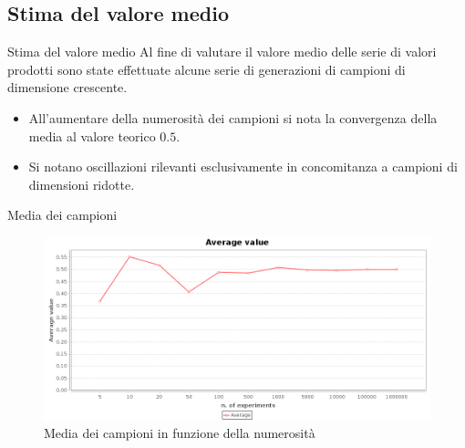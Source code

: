 \documentclass[slidestop,compress,mathserif]{beamer}
\begin{document}
\subsection{Stima del valore medio}
\begin{frame}{Stima del valore medio}
\vfill
Al fine di valutare il valore medio delle serie di valori prodotti sono state effettuate alcune serie di generazioni di campioni di dimensione crescente.
\begin{itemize}
	\footnotesize
	\item[\textbullet] All'aumentare della numerosit\`a dei campioni si nota la convergenza della media al valore teorico $0.5$.
	\item[\textbullet] Si notano oscillazioni rilevanti esclusivamente in concomitanza a campioni di dimensioni ridotte.
\end{itemize}
\vfill
\end{frame}

\begin{frame}{Media dei campioni}
\begin{figure}[!h]{
	\begin{center}
	   \includegraphics[width=0.95	\textwidth]{figures/average.png}
	\end{center}}
	\caption{Media dei campioni in funzione della numerosit\`a}
	\label{fig:avg}
\end{figure}
\end{frame}
\end{document}
